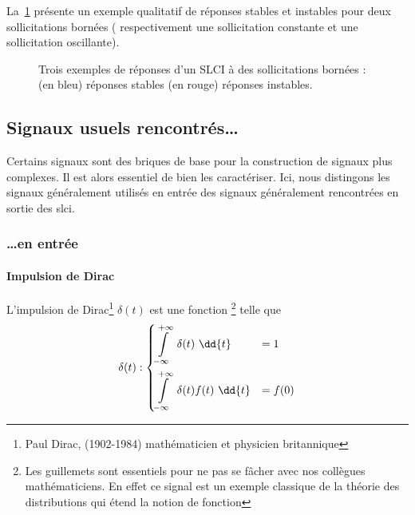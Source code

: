 La~\cref{fig-stabilite_signaux} présente un exemple qualitatif de réponses 
stables et instables pour deux sollicitations bornées ( respectivement une 
sollicitation constante et une sollicitation oscillante).


\begin{figure}[!ht]
\begin{center}

\caption{Trois exemples de réponses d'un SLCI à des sollicitations bornées : 
         (en bleu)  réponses stables 
         (en rouge) réponses instables.\label{fig-stabilite_signaux}}
\end{center}                
\end{figure}


\clearpage
\subsection{Signaux usuels rencontrés\ldots\label{sec-signaux_usuels}}

Certains signaux sont des briques de base pour la construction de
signaux plus complexes. Il est alors essentiel de bien les caractériser.
Ici, nous distingons les signaux généralement utilisés en 
entrée des signaux généralement rencontrées en sortie des \gls{slci}.

\subsubsection{\ldots en entrée}

\paragraph{Impulsion de Dirac}

L'impulsion de Dirac\footnote{Paul Dirac, (1902-1984) 
mathématicien et physicien britannique} $\delta(t)$ est une \og fonction\fg 
\footnote{Les guillemets sont essentiels pour ne pas se fâcher avec 
nos collègues mathématiciens. En effet ce signal est un exemple classique de la 
théorie des distributions qui étend la notion de fonction} telle que
\begin{align*}
\delta(t) : 
\begin{dcases}
	\int\limits_{-\infty}^{+\infty}	 \delta(t)\,\,\dd{t}&=1   \\
\int\limits_{-\infty}^{+\infty}  \delta(t)f(t)\,\,\dd{t}&=f(0)	
\end{dcases}
\end{align*}

